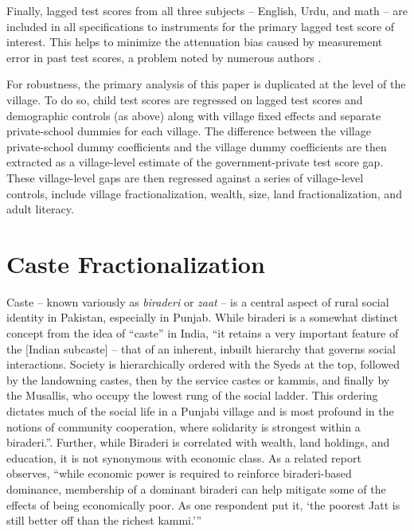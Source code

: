 \documentclass[12pt]{article}
\begin{document}
Finally, lagged test scores from all three subjects -- English, Urdu, and math -- are included in all specifications to instruments for the primary lagged test score of interest. This helps to minimize the attenuation bias caused by measurement error in past test scores, a problem noted by numerous authors \citep{Kane:2002if,Chay:2005wu,Andrabi:2011hl}. 

For robustness, the primary analysis of this paper is duplicated at the level of the village. To do so, child test scores are regressed on lagged test scores and demographic controls (as above) along with village fixed effects and separate private-school dummies for each village. The difference between the village private-school dummy coefficients and the village dummy coefficients are then extracted as a village-level estimate of the government-private test score gap. These village-level gaps are then regressed against a series of village-level controls, include village fractionalization, wealth, size, land fractionalization, and adult literacy. 

\section{Caste Fractionalization}\label{caste}

Caste -- known variously as \emph{biraderi} or \emph{zaat} -- is a central aspect of rural social identity in Pakistan, especially in Punjab. While biraderi is a somewhat distinct concept from the idea of ``caste'' in India, ``it retains a very important feature of the [Indian subcaste] -- that of an inherent, inbuilt hierarchy that governs social interactions. Society is hierarchically ordered with the Syeds at the top, followed by the landowning castes, then by the service castes or kammis, and finally by the Musallis, who occupy the lowest rung of the social ladder. This ordering dictates much of the social life in a Punjabi village and is most profound in the notions of community cooperation, where solidarity is strongest within a biraderi.''\citep[p. 29]{Gazdar:2007vt}. Further, while Biraderi is correlated with wealth, land holdings, and education, it is not synonymous with economic class. As a related report observes, ``while economic power is required to reinforce biraderi-based dominance, membership of a dominant biraderi can help mitigate some of the effects of being economically poor. As one respondent put it, `the poorest Jatt is still better off than the richest kammi.''' \citep[p. 13]{Gazdar:2007vt} 
\end{document}
